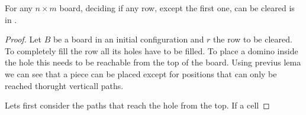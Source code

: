 \begin{lemma0}
For any $n \times m$ board, deciding if any row, except the first one, can be cleared is in \pp.
\end{lemma0}

\begin{proof}
  Let $B$ be a board in an initial configuration and $r$ the row to be cleared. To completely fill the row all its holes have to be filled. To place a domino inside the hole this needs to be reachable from the top of the board. Using previus lema we can see that a piece can be placed except for positions that can only be reached thorught verticall paths.

  Lets first consider the paths that reach the hole from the top. If a cell

\end{proof}
